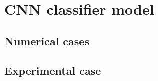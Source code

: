 \section{CNN classifier model}
\label{sec51}



\subsection{Numerical cases}
\label{sec511}

\subsection{Experimental case}
\label{sec512}
